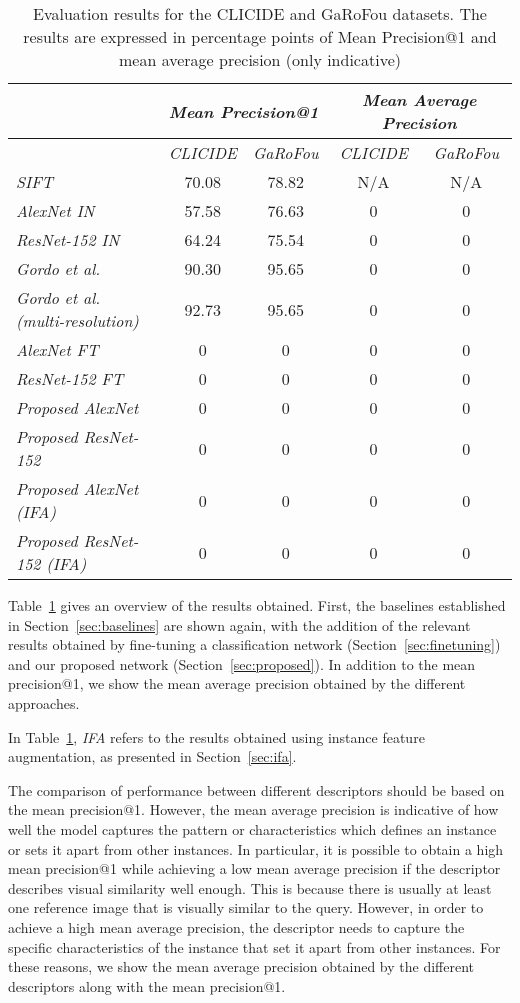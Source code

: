 \begin{table}
\begin{tabular}{|l|c|c|c|c|}
\hline & \multicolumn{2}{c|}{\emph{Mean Precision@1}} &
\multicolumn{2}{c|}{\emph{Mean Average Precision}}\\
\hline & \emph{CLICIDE} & \emph{GaRoFou} & \emph{CLICIDE} & \emph{GaRoFou}\\
\hline \emph{SIFT} & 70.08 & 78.82 & N/A & N/A\\
\hline \emph{AlexNet IN} & 57.58 & 76.63 & 0 & 0\\
\hline \emph{ResNet-152 IN} & 64.24 & 75.54 & 0 & 0\\
\hline \emph{Gordo et al.~\cite{gordo_deep_2016}}
& 90.30 & 95.65 & 0 & 0\\
\hline \emph{Gordo et al.~\cite{gordo_deep_2016} (multi-resolution)}
& 92.73 & 95.65 & 0 & 0\\
\hline \emph{AlexNet FT} & 0 & 0 & 0 & 0\\ %
\hline \emph{ResNet-152 FT} & 0 & 0 & 0 & 0\\
\hline \emph{Proposed AlexNet} & 0 & 0 & 0 & 0\\ %
\hline \emph{Proposed ResNet-152} & 0 & 0 & 0 & 0\\
\hline \emph{Proposed AlexNet (IFA)} & 0 & 0 & 0 & 0\\ %
\hline \emph{Proposed ResNet-152 (IFA)} & 0 & 0 & 0 & 0\\
\hline
\end{tabular}
\caption{Evaluation results for the CLICIDE and GaRoFou datasets.
The results are expressed in percentage points of
Mean Precision@1 and mean average precision (only indicative)
\label{tab:results}}
\end{table}

Table~\ref{tab:results} gives an overview of the results obtained. First,
the baselines established in Section~\ref{sec:baselines} are shown
again, with the addition of the relevant results obtained by fine-tuning
a classification network (Section~\ref{sec:finetuning}) and our
proposed network (Section~\ref{sec:proposed}).
In addition to the mean precision@1, we show the mean average
precision obtained by the different approaches.

In Table~\ref{tab:results}, \emph{IFA} refers to the results obtained
using instance feature augmentation, as presented in Section~\ref{sec:ifa}.

The comparison of performance between different descriptors should
be based on the mean precision@1. However, the mean average
precision is indicative of how well the model
captures the pattern or characteristics which defines an instance or
sets it apart from other instances. In particular, it is possible to obtain
a high mean precision@1 while achieving a low mean average precision
if the descriptor describes visual similarity well enough. This is because
there is usually at least one reference image that is visually similar
to the query. However, in order to achieve a high mean average precision,
the descriptor needs to capture the specific characteristics of the
instance that set it apart from other instances. For these reasons,
we show the mean average precision obtained by the different
descriptors along with the mean precision@1.

